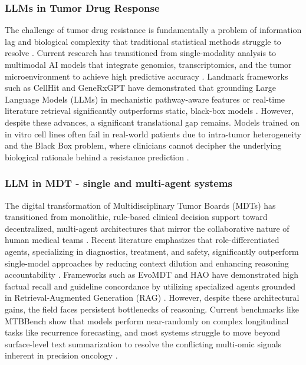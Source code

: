 \documentclass{article}
\begin{document}
\subsubsection{LLMs in Tumor Drug Response}
The challenge of tumor drug resistance is fundamentally a problem of information lag and biological complexity that traditional statistical methods struggle to resolve \cite{mao2025emerging}. Current research has transitioned from single-modality analysis to multimodal AI models that integrate genomics, transcriptomics, and the tumor microenvironment to achieve high predictive accuracy \cite{mao2025emerging, liu2025multiomics, wu2026leveraging, su2025applications}. Landmark frameworks such as CellHit and GeneRxGPT have demonstrated that grounding Large Language Models (LLMs) in mechanistic pathway-aware features or real-time literature retrieval significantly outperforms static, black-box models \cite{carli2025learning, lai2025inferring}. However, despite these advances, a significant translational gap remains. Models trained on in vitro cell lines often fail in real-world patients due to intra-tumor heterogeneity and the Black Box problem, where clinicians cannot decipher the underlying biological rationale behind a resistance prediction \cite{mao2025emerging, carli2025learning, su2025applications}. 

\subsubsection{LLM in MDT - single and multi-agent systems}
The digital transformation of Multidisciplinary Tumor Boards (MDTs) has transitioned from monolithic, rule-based clinical decision support toward decentralized, multi-agent architectures that mirror the collaborative nature of human medical teams \cite{liu2026evomdt, zhang2025multiagent, han2025multiagent}. Recent literature emphasizes that role-differentiated agents, specializing in diagnostics, treatment, and safety, significantly outperform single-model approaches by reducing context dilution and enhancing reasoning accountability \cite{liu2026evomdt, zhang2025multiagent, codella2025demo}. Frameworks such as EvoMDT and HAO have demonstrated high factual recall and guideline concordance by utilizing specialized agents grounded in Retrieval-Augmented Generation (RAG) \cite{liu2026evomdt, codella2025demo}. However, despite these architectural gains, the field faces persistent bottlenecks of reasoning. Current benchmarks like MTBBench show that models perform near-randomly on complex longitudinal tasks like recurrence forecasting, and most systems struggle to move beyond surface-level text summarization to resolve the conflicting multi-omic signals inherent in precision oncology \cite{vasilev2025mtbbench, codella2025demo, lorenzo2026evaluation}.   
\end{document}
